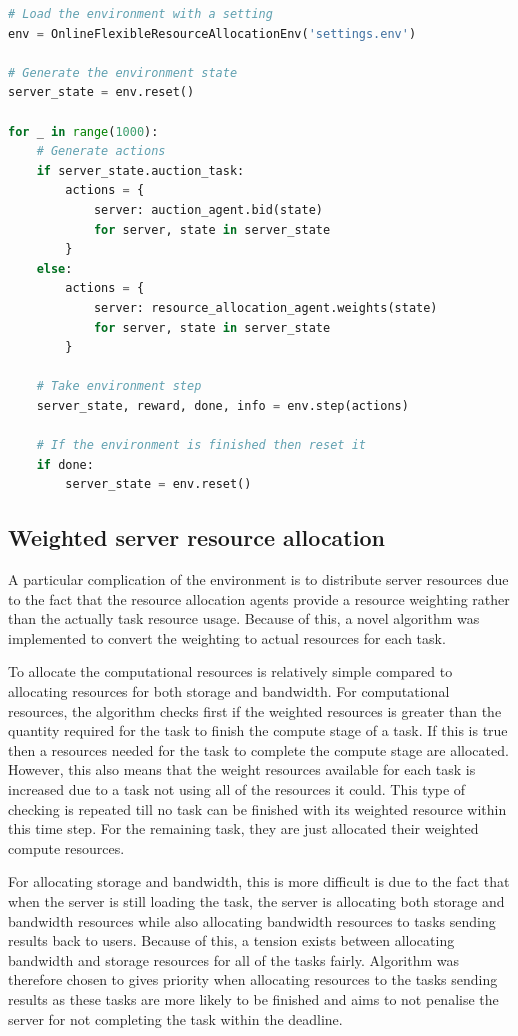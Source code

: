 \begin{lstlisting}[language=Python, frame=single, caption={Example code for running the environment}, captionpos=b, label={lst:example_flexible_resource_env}]
# Load the environment with a setting
env = OnlineFlexibleResourceAllocationEnv('settings.env')

# Generate the environment state
server_state = env.reset()

for _ in range(1000):
    # Generate actions
    if server_state.auction_task:
        actions = {
            server: auction_agent.bid(state)
            for server, state in server_state
        }
    else:
        actions = {
            server: resource_allocation_agent.weights(state)
            for server, state in server_state
        }

    # Take environment step
    server_state, reward, done, info = env.step(actions)

    # If the environment is finished then reset it
    if done:
        server_state = env.reset()
\end{lstlisting}

\subsection{Weighted server resource allocation}\label{subsec:weighted-server-resource-allocation}
A particular complication of the environment is to distribute server resources due to the fact that the resource
allocation agents provide a resource weighting rather than the actually task resource usage. Because of this, a novel
algorithm was implemented to convert the weighting to actual resources for each task.

To allocate the computational resources is relatively simple compared to allocating resources for both storage and
bandwidth. For computational resources, the algorithm checks first if the weighted resources is greater than the
quantity required for the task to finish the compute stage of a task. If this is true then a resources needed for the
task to complete the compute stage are allocated. However, this also means that the weight resources available for each
task is increased due to a task not using all of the resources it could. This type of checking is repeated till no task
can be finished with its weighted resource within this time step. For the remaining task, they are just allocated their
weighted compute resources.

For allocating storage and bandwidth, this is more difficult is due to the fact that when the server is still
loading the task, the server is allocating both storage and bandwidth resources while also allocating bandwidth
resources to tasks sending results back to users. Because of this, a tension exists between allocating bandwidth and
storage resources for all of the tasks fairly. Algorithm was therefore chosen to gives priority when allocating
resources to the tasks sending results as these tasks are more likely to be finished and aims to not penalise the
server for not completing the task within the deadline.

